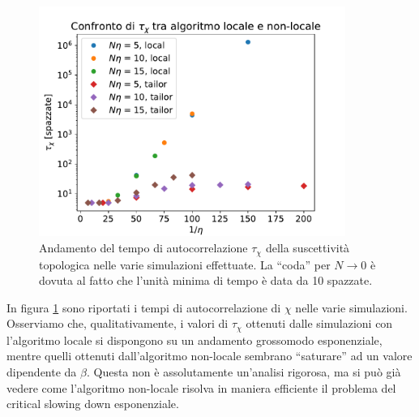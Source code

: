 \documentclass[a4paper,11pt]{article}
\begin{document}
    \begin{figure}[htb]
        \centering
        \includegraphics[width=10cm]{figure/csd_autocorr.pdf}
        \caption{Andamento del tempo di autocorrelazione $\tau_\chi$ della suscettività topologica nelle varie simulazioni effettuate. La ``coda'' per $N \to 0$ è dovuta al fatto che l'unità minima di tempo è data da 10 spazzate.}
        \label{fig:csd_autocorr}
    \end{figure}

    
    In figura \ref{fig:csd_autocorr} sono riportati i tempi di autocorrelazione di $\chi$ nelle varie simulazioni. Osserviamo che, qualitativamente, i valori di $\tau_\chi$ ottenuti dalle simulazioni con l'algoritmo locale si dispongono su un andamento grossomodo esponenziale, mentre quelli ottenuti dall'algoritmo non-locale sembrano ``saturare'' ad un valore dipendente da $\beta$. Questa non è assolutamente un'analisi rigorosa, ma si può già vedere come l'algoritmo non-locale risolva in maniera efficiente il problema del critical slowing down esponenziale.
    
\end{document}
